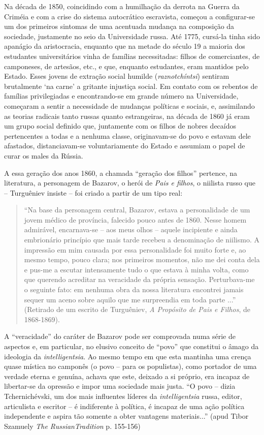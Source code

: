 Na década de 1850, coincidindo com a humilhação da derrota na Guerra da
Criméia e com a crise do sistema autocrático escravista, começou a
configurar-se um dos primeiros sintomas de uma acentuada mudança na
composição da sociedade, justamente no seio da Universidade russa. Até
1775, cursá-la tinha sido apanágio da aristocracia, enquanto que na
metade do século 19 a maioria dos estudantes universitários vinha de
famílias necessitadas: filhos de comerciantes, de camponeses, de
artesãos, etc., e que, enquanto estudantes, eram mantidos pelo Estado.
Esses jovens de extração social humilde (\emph{raznotchíntsi}) sentiram
brutalmente `na carne' a gritante injustiça social. Em contato com os
rebentos de famílias privilegiadas e encontrando-se em grande número na
Universidade, começaram a sentir a necessidade de mudanças políticas e
sociais, e, assimilando as teorias radicais tanto russas quanto
estrangeiras, na década de 1860 já eram um grupo social definido que,
juntamente com os filhos de nobres decaídos pertencentes a todas e a
nenhuma classe, originavam-se do povo e estavam dele afastados,
distanciavam-se voluntariamente do Estado e assumiam o papel de curar os
males da Rússia.

A essa geração dos anos 1860, a chamada ``geração dos filhos'' pertence,
na literatura, a personagem de Bazarov, o herói de \emph{Pais e filhos},
o niilista russo que -- Turguêniev insiste -- foi criado a partir de um
tipo real:

\begin{quote}
``Na base da personagem central, Bazarov, estava a personalidade de um
jovem médico de província, falecido pouco antes de 1860. Nesse homem
admirável, encarnava-se -- aos meus olhos -- aquele incipiente e ainda
embrionário princípio que mais tarde recebeu a denominação de niilismo.
A impressão em mim causada por essa personalidade foi muito forte e, ao
mesmo tempo, pouco clara; nos primeiros momentos, não me dei conta dela
e pus-me a escutar intensamente tudo o que estava à minha volta, como
que querendo acreditar na veracidade da própria sensação. Perturbava-me
o seguinte fato: em nenhuma obra da nossa literatura encontrei jamais
sequer um aceno sobre aquilo que me surpreendia em toda parte ...''
(Retirado de um escrito de Turguêniev, \emph{A Propósito de Pais e
Filhos}, de 1868-1869).
\end{quote}

A ``veracidade'' do caráter de Bazarov pode ser comprovada numa série de
aspectos e, em particular, no elusivo conceito de ``povo'' que constitui
o âmago da ideologia da \emph{intelligentsia}. Ao mesmo tempo em que
esta mantinha uma crença quase mística no camponês (o povo -- para os
populistas), como portador de uma verdade eterna e genuína, achava que
este, deixado a si próprio, era incapaz de libertar-se da opressão e
impor uma sociedade mais justa. ``O povo -- dizia Tchernichévski, um dos
mais influentes líderes da \emph{intelligentsia} russa, editor,
articulista e escritor -- é indiferente à política, é incapaz de uma
ação política independente e aspira tão somente a obter vantagens
materiais...'' (apud Tibor Szamuely \emph{The RussianTradition} p.
155-156)

